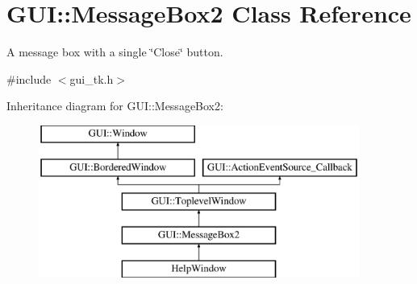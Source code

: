 \hypertarget{classGUI_1_1MessageBox2}{\section{G\-U\-I\-:\-:Message\-Box2 Class Reference}
\label{classGUI_1_1MessageBox2}
}


A message box with a single \char`\"{}\-Close\char`\"{} button.  




{\ttfamily \#include $<$gui\-\_\-tk.\-h$>$}

Inheritance diagram for G\-U\-I\-:\-:Message\-Box2\-:\begin{figure}[H]
\begin{center}
\leavevmode
\includegraphics[height=5.000000cm]{classGUI_1_1MessageBox2}
\end{center}
\end{figure}
